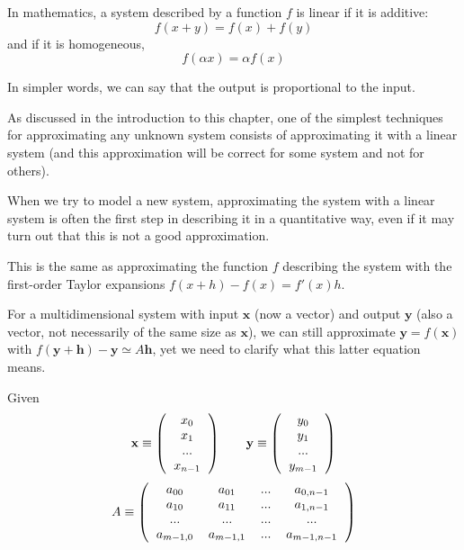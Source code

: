 \documentclass[justified, sixbynine]{tufte-book}
\theoremstyle{plain}%
\newtheorem * {corollary}{Corollary}
\theoremstyle{definition}
\theoremstyle{remark}
\newtheorem * {remark}{Remark}
\newtheorem * {note}{Note}
\begin{document}
\begin{fullwidth}
In mathematics, a system described by a function $f$ is linear if it is additive:
\begin{equation}
f(x+y) = f(x) + f(y)
\end{equation}
and if it is homogeneous,
\begin{equation}
f(\alpha x) = \alpha f(x)
\end{equation}

In simpler words, we can say that the output is proportional to the input.

As discussed in the introduction to this chapter, one of the simplest techniques for approximating any unknown system consists of approximating it with a linear system (and this approximation will be correct for some system and not for others).

When we try to model a new system, approximating the system with a linear system is often the first step in describing it in a quantitative way, even if it may turn out that this is not a good approximation.

This is the same as approximating the function $f$ describing the system with the first-order Taylor expansions $f(x+h) - f(x) = f'(x) h$.

For a multidimensional system with input $\mathbf{x}$ (now a vector) and output $\mathbf{y}$ (also a vector, not necessarily of the same size as $\mathbf{x}$), we can still approximate $\mathbf{y}=f(\mathbf{x})$ with
$f(\mathbf{y}+\mathbf{h}) - \mathbf{y} \simeq A \mathbf{h}$, yet we need to clarify what this latter equation means.

Given
\begin{equation}
\mathbf{x} \equiv \left(\begin{tabular}{c}$x_0$\\$x_1$\\...\\$x_{n-1}$\end{tabular}\right)\qquad
\mathbf{y} \equiv \left(\begin{tabular}{c}$y_0$\\$y_1$\\...\\$y_{m-1}$\end{tabular}\right)
\end{equation}
\begin{equation}
A \equiv \left(\begin{tabular}{cccc}
$a_{00}$ & $a_{01}$ & ... & $a_{0, n-1}$ \\
$a_{10}$ & $a_{11}$ & ... & $a_{1, n-1}$ \\
... & ... & ... & ... \\
$a_{m-1, 0}$ & $a_{m-1, 1}$ & ... & $a_{m-1, n-1}$
\end{tabular}\right)
\end{equation}


\end{fullwidth}
\end{document}
